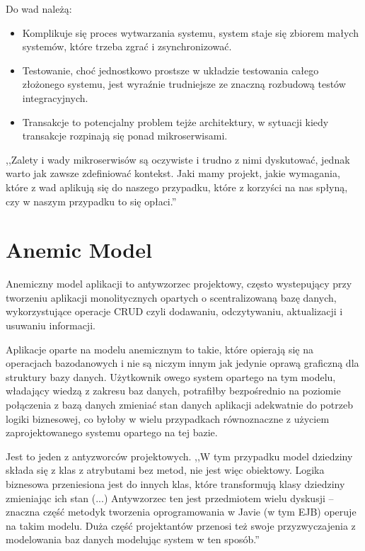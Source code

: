 Do wad \cite{Micro2} należą:
\begin{itemize}
    \item Komplikuje się proces wytwarzania systemu, system staje się zbiorem małych systemów, które trzeba zgrać i zsynchronizować.
    \item Testowanie, choć jednostkowo prostsze w układzie testowania całego złożonego systemu, jest wyraźnie trudniejsze ze znaczną rozbudową testów integracyjnych.
    \item Transakcje to potencjalny problem tejże architektury, w sytuacji kiedy transakcje rozpinają się ponad mikroserwisami.
\end{itemize}

,,Zalety i wady mikroserwisów są oczywiste i trudno z nimi dyskutować, jednak warto jak zawsze zdefiniować kontekst. Jaki mamy projekt, jakie wymagania, które z wad aplikują się do naszego przypadku, które z korzyści na nas spłyną, czy w naszym przypadku to się opłaci.''\cite{Micro2}

\section{Anemic Model}
Anemiczny model aplikacji to antywzorzec projektowy, często wystepujący przy tworzeniu aplikacji monolitycznych opartych o scentralizowaną bazę danych, wykorzystujące operacje CRUD czyli dodawaniu, odczytywaniu, aktualizacji i usuwaniu informacji.

Aplikacje oparte na modelu anemicznym to takie, które opierają się na operacjach bazodanowych i nie są niczym innym jak jedynie oprawą graficzną dla struktury bazy danych. Użytkownik owego system opartego na tym modelu, władający wiedzą z zakresu baz danych, potrafiłby bezpośrednio na poziomie połączenia z bazą danych zmieniać stan danych aplikacji adekwatnie do potrzeb logiki biznesowej, co byłoby w wielu przypadkach równoznaczne z użyciem zaprojektowanego systemu opartego na tej bazie.

Jest to jeden z antyzworców projektowych.
,,W tym przypadku model dziedziny składa się z klas z atrybutami bez metod, nie jest więc obiektowy. Logika biznesowa przeniesiona jest do innych klas, które transformują klasy dziedziny zmieniając ich stan (...) Antywzorzec ten jest przedmiotem wielu dyskusji – znaczna część metodyk tworzenia oprogramowania w Javie (w tym EJB) operuje na takim modelu. Duża część projektantów przenosi też swoje przyzwyczajenia z modelowania baz danych modelując system w ten sposób.''\cite{Antywzorzec-projektowy}

